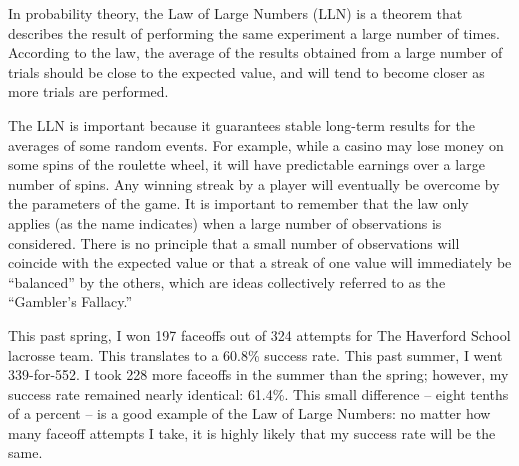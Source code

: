 
In probability theory, the Law of Large Numbers (LLN) is a theorem that describes the result of performing the same experiment a large number of times. According to the law, the average of the results obtained from a large number of trials should be close to the expected value, and will tend to become closer as more trials are performed.

The LLN is important because it guarantees stable long-term results for the averages of some random events. For example, while a casino may lose money on some spins of the roulette wheel, it will have predictable earnings over a large number of spins. Any winning streak by a player will eventually be overcome by the parameters of the game. It is important to remember that the law only applies (as the name indicates) when a large number of observations is considered. There is no principle that a small number of observations will coincide with the expected value or that a streak of one value will immediately be ``balanced'' by the others, which are ideas collectively referred to as the ``Gambler’s Fallacy.''

This past spring, I won 197 faceoffs out of 324 attempts for The Haverford School lacrosse team. This translates to a 60.8\% success rate. This past summer, I went 339-for-552. I took 228 more faceoffs in the summer than the spring; however, my success rate remained nearly identical: 61.4\%. This small difference – eight tenths of a percent – is a good example of the Law of Large Numbers: no matter how many faceoff attempts I take, it is highly likely that my success rate will be the same. 
